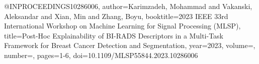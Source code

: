 @INPROCEEDINGS{10286006,
  author={Karimzadeh, Mohammad and Vakanski, Aleksandar and Xian, Min and Zhang, Boyu},
  booktitle={2023 IEEE 33rd International Workshop on Machine Learning for Signal Processing (MLSP)}, 
  title={Post-Hoc Explainability of BI-RADS Descriptors in a Multi-Task Framework for Breast Cancer Detection and Segmentation}, 
  year={2023},
  volume={},
  number={},
  pages={1-6},
  doi={10.1109/MLSP55844.2023.10286006}}

